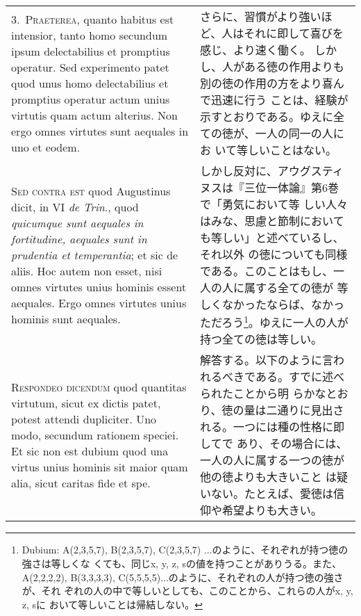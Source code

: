 \documentclass[10pt]{jsarticle}
\begin{document}
\begin{longtable}{p{21em}p{21em}}
\\



3.~{\scshape Praeterea}, quanto habitus est intensior, tanto homo
secundum ipsum delectabilius et promptius operatur. Sed experimento
patet quod unus homo delectabilius et promptius operatur actum unius
virtutis quam actum alterius. Non ergo omnes virtutes sunt aequales in
uno et eodem.

&

 さらに、習慣がより強いほど、人はそれに即して喜びを感じ、より速く働く。
 しかし、人がある徳の作用よりも別の徳の作用の方をより喜んで迅速に行う
 ことは、経験が示すとおりである。ゆえに全ての徳が、一人の同一の人にお
 いて等しいことはない。

\\



{\scshape Sed contra est} quod Augustinus dicit, in VI {\itshape de
Trin}., quod {\itshape quicumque sunt aequales in fortitudine,
aequales sunt in prudentia et temperantia}; et sic de aliis. Hoc autem
non esset, nisi omnes virtutes unius hominis essent aequales. Ergo
omnes virtutes unius hominis sunt aequales.


&

 しかし反対に、アウグスティヌスは『三位一体論』第6巻で「勇気において等
 しい人々はみな、思慮と節制においても等しい」と述べているし、それ以外
 の徳についても同様である。このことはもし、一人の人に属する全ての徳が
 等しくなかったならば、なかっただろう\footnote{Dubium: A(2,3,5,7),
 B(2,3,5,7), C(2,3,5,7) ...のように、それぞれが持つ徳の強さは等しくな
 くても、同じx, y, z, sの値を持つことがありうる。また、A(2,2,2,2),
 B(3,3,3,3), C(5,5,5,5)...のように、それぞれの人が持つ徳の強さが、それ
 ぞれの人の中で等しいとしても、このことから、これらの人がx, y, z, sに
 おいて等しいことは帰結しない。}。ゆえに一人の人が持つ全ての徳は等しい。

\\


 {\scshape Respondeo dicendum} quod quantitas virtutum, sicut ex
 dictis patet, potest attendi dupliciter. Uno modo, secundum rationem
 speciei. Et sic non est dubium quod una virtus unius hominis sit
 maior quam alia, sicut caritas fide et spe.

&

 解答する。以下のように言われるべきである。すでに述べられたことから明
 らかなとおり、徳の量は二通りに見出される。一つには種の性格に即してで
 あり、その場合には、一人の人に属する一つの徳が他の徳よりも大きいこと
 は疑いない。たとえば、愛徳は信仰や希望よりも大きい。


\end{longtable}
\end{document}
